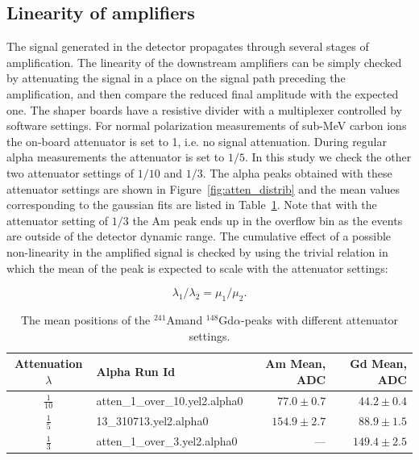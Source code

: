 \documentclass[a4paper,12pt]{article}
\newcommand\americium{${}^{241}$Am}
\newcommand\gadolinium{${}^{148}$Gd}
\begin{document}
\subsection{Linearity of amplifiers}

The signal generated in the detector propagates through several stages of
amplification. The linearity of the downstream amplifiers can be simply checked
by attenuating the signal in a place on the signal path preceding the
amplification, and then compare the reduced final amplitude with the expected
one. The shaper boards have a resistive divider with a multiplexer controlled by
software settings. For normal polarization measurements of sub-MeV carbon ions
the on-board attenuator is set to 1, i.e. no signal attenuation. During regular
alpha measurements the attenuator is set to $1/5$. In this study we check the
other two attenuator settings of $1/10$ and $1/3$. The alpha peaks obtained with
these attenuator settings are shown in Figure~\ref{fig:atten_distrib} and the
mean values corresponding to the gaussian fits are listed in
Table~\ref{table:atten}. Note that with the attenuator setting of $1/3$ the Am
peak ends up in the overflow bin as the events are outside of the detector
dynamic range. The cumulative effect of a possible non-linearity in the
amplified signal is checked by using the trivial relation in which the mean of
the peak is expected to scale with the attenuator settings:

\begin{equation}
\lambda_1/\lambda_2 = \mu_1/ \mu_2.
\label{eq:atten_linearity}
\end{equation}


\begin{table}[htb]
\caption{The mean positions of the \americium and \gadolinium $\alpha$-peaks
with different attenuator settings.}
\centering

\begin{tabular}{clrr}
\toprule
Attenuation $\lambda$ & Alpha Run Id      & Am Mean, ADC      & Gd Mean, ADC \\
\midrule
$\frac{1}{10}$  & \small{atten\_1\_over\_10.yel2.alpha0}  & $77.0\pm0.7$      & $44.2\pm0.4$ \\
\addlinespace
$\frac{1}{5}$   & \small{13\_310713.yel2.alpha0}          & $154.9\pm2.7$     & $88.9\pm1.5$ \\
\addlinespace
$\frac{1}{3}$   & \small{atten\_1\_over\_3.yel2.alpha0}   & ---\hspace{20pt}  & $149.4\pm2.5$ \\
\bottomrule
\end{tabular}

\label{table:atten}
\end{table}
\end{document}
